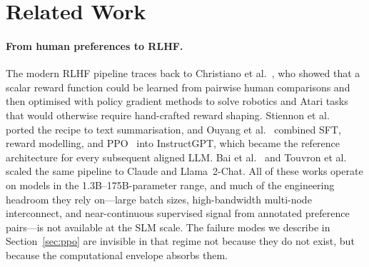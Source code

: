 \documentclass[10pt,twocolumn,letterpaper]{article}
\begin{document}
\section{Related Work}
\label{sec:related}

\paragraph{From human preferences to RLHF.}
The modern RLHF pipeline traces back to Christiano et al.~\cite{christiano2017deep}, who showed that a scalar reward function could be learned from pairwise human comparisons and then optimised with policy gradient methods to solve robotics and Atari tasks that would otherwise require hand-crafted reward shaping. Stiennon et al.~\cite{stiennon2020learning} ported the recipe to text summarisation, and Ouyang et al.~\cite{ouyang2022training} combined SFT, reward modelling, and PPO~\cite{schulman2017proximal} into InstructGPT, which became the reference architecture for every subsequent aligned LLM. Bai et al.~\cite{bai2022training,bai2022constitutional} and Touvron et al.~\cite{touvron2023llama} scaled the same pipeline to Claude and Llama~2-Chat. All of these works operate on models in the 1.3B--175B-parameter range, and much of the engineering headroom they rely on---large batch sizes, high-bandwidth multi-node interconnect, and near-continuous supervised signal from annotated preference pairs---is not available at the SLM scale. The failure modes we describe in Section~\ref{sec:ppo} are invisible in that regime not because they do not exist, but because the computational envelope absorbs them.
\end{document}
